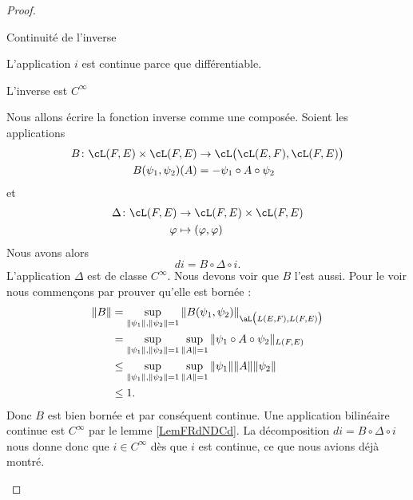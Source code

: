 \begin{proof}
\begin{subproof}
    \item[Continuité de l'inverse]

        L'application \( i\) est continue parce que différentiable.
    \item[L'inverse est \(  C^{\infty}\)]

        Nous allons écrire la fonction inverse comme une composée. Soient les applications
        \begin{equation}
            \begin{aligned}
                B\colon \cL(F,E)\times \cL(F,E)&\to \cL\big( \cL(E,F),\cL(F,E) \big) \\
                B(\psi_1,\psi_2)(A)&= -\psi_1\circ A\circ\psi_2
            \end{aligned}
        \end{equation}
        et
        \begin{equation}
            \begin{aligned}
                \Delta\colon \cL(F,E)&\to \cL(F,E)\times \cL(F,E) \\
                \varphi&\mapsto (\varphi,\varphi) 
            \end{aligned}
        \end{equation}
        Nous avons alors 
        \begin{equation}
            di=B\circ\Delta\circ i.
        \end{equation}
        L'application \( \Delta\) est de classe \(  C^{\infty}\). Nous devons voir que \( B\) l'est aussi. Pour le voir nous commençons par prouver qu'elle est bornée :
        \begin{equation}
            \begin{aligned}[]
                \| B \|&=\sup_{\| \psi_1 \|,\| \psi_2 \|=1}\| B(\psi_1,\psi_2) \|_{\aL\big( L(E,F),L(F,E) \big)}\\
                &=\sup_{  \| \psi_1 \|,\| \psi_2 \|=1 }\sup_{\| A \|=1}\| \psi_1\circ A\circ\psi_2 \|_{L(F,E)}\\
                &\leq \sup_{\| \psi_1 \|,\| \psi_2 \|=1}\sup_{\| A \|=1}\| \psi_1 \|\| A \|\| \psi_2 \|\\
                &\leq 1.
            \end{aligned}
        \end{equation}
        Donc \( B\) est bien bornée et par conséquent continue. Une application bilinéaire continue est \(  C^{\infty}\) par le lemme \ref{LemFRdNDCd}. La décomposition \( di=B\circ \Delta\circ i\) nous donne donc que \( i\in C^{\infty}\) dès que \( i\) est continue, ce que nous avions déjà montré.
        \end{subproof}
\end{proof}

